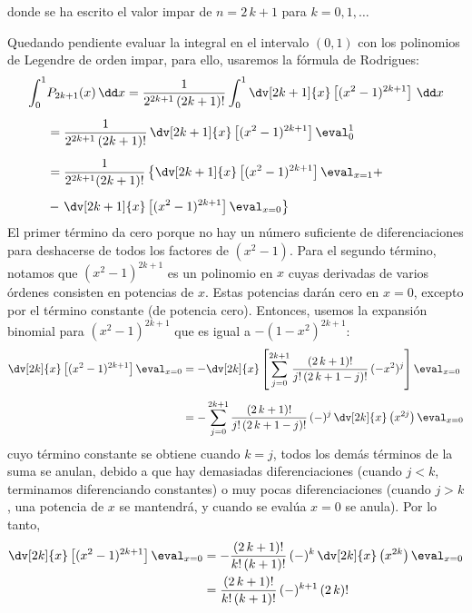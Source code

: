 donde se ha escrito el valor impar de $n = 2 \, k + 1$ para $k = 0, 1, \ldots$
\par
Quedando pendiente evaluar la integral en el intervalo $(0,1)$ con los polinomios de Legendre de orden impar, para ello, usaremos la fórmula de Rodrigues:
\begin{align*}
\int_{0}^{1} &P_{2k+1} (x) \, \dd x
 = \dfrac{1}{2^{2k+1} \, (2k+1)!} \int_{0}^{1} \dv[2k+1]{x} \left[ (x^{2} - 1)^{2k+1} \right] \, \dd x \\[0.5em]
&= \dfrac{1}{2^{2k+1} \, (2k+1)!} \, \dv[2k+1]{x} \left[ (x^{2} - 1)^{2k+1} \right] \eval_{0}^{1} \\[0.5em]
&= \dfrac{1}{2^{2k+1} (2k+1)!} \left\{ \dv[2k+1]{x} \left[ (x^{2} - 1)^{2k+1} \right] \eval_{x=1} + \right. \\[0.5em]
&- \left. \dv[2k+1]{x} \left[ (x^{2} - 1)^{2k+1} \right] \eval_{x=0} \right\}
\end{align*}
El primer término da cero porque no hay un número suficiente de diferenciaciones para deshacerse de todos los factores de $(x^{2} - 1)$. Para el segundo término, notamos que $(x^{2} - 1)^{2k+1}$ es un polinomio en $x$ cuyas derivadas de varios órdenes consisten en potencias de $x$. Estas potencias darán cero en $x = 0$, excepto por el término constante (de potencia cero). Entonces, usemos la expansión binomial para $(x^{2} - 1)^{2k+1}$ que es igual a $-(1 - x^{2})^{2k+1}$:
\begin{align*}
\dv[2k]{x} \left[ (x^{2} - 1)^{2k+1} \right] \eval_{x=0} &= - \dv[2k]{x} \left[ \sum_{j=0}^{2k+1} \dfrac{(2 \, k + 1)!}{j! \, (2 \, k + 1 - j)!} \, (-x^{2})^{j} \right] \eval_{x=0} \\[0.5em]
&= - \sum_{j=0}^{2k+1} \dfrac{(2 \, k + 1)!}{j! \, (2 \, k + 1 - j)!} \, (-)^{j} \, \dv[2k]{x} \left( x^{2j} \right) \eval_{x=0}
\end{align*}
cuyo término constante se obtiene cuando $k = j$, todos los demás términos de la suma se anulan, debido a que hay demasiadas diferenciaciones (cuando $j < k$, terminamos diferenciando constantes) o muy pocas diferenciaciones (cuando $j > k$, una potencia de $x$ se mantendrá, y cuando se evalúa $x = 0$ se anula). Por lo tanto,
\begin{align*}
\dv[2k]{x} \left[ (x^{2} - 1)^{2k+1} \right] \eval_{x=0} &= - \dfrac{(2 \, k + 1)!}{k! \, (k + 1)!} \, (-)^{k} \, \dv[2k]{x} \left( x^{2k} \right) \eval_{x=0} \\
&= \dfrac{(2 \, k + 1)!}{k! \, (k + 1)!} \, (-)^{k+1} \, (2 \, k )!
\end{align*}
